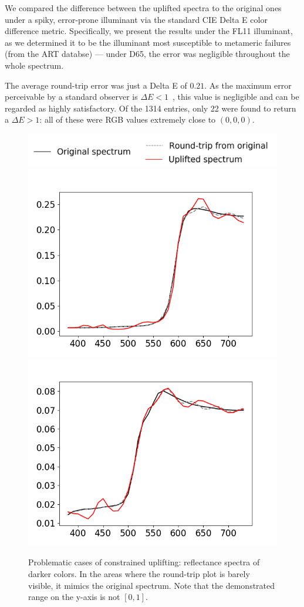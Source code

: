 We compared the difference between the uplifted spectra to the original ones under a spiky, error-prone illuminant via the standard CIE Delta E color difference metric. Specifically, we present the results under the FL11 illuminant, as we determined it to be the illuminant most susceptible to metameric failures (from the ART databse) --- under D65, the error was negligible throughout the whole spectrum.

The average round-trip error was just a Delta E of $0.21$. As the maximum error perceivable by a standard observer is $\Delta E<1$~\cite{maxColorDifference}, this value is negligible and can be regarded as highly satisfactory. Of the 1314 entries, only 22 were found to return a $\Delta E > 1$: all of these were RGB values extremely close to $(0,0,0)$. 

\begin{figure}[t!]
	\centering
	\includegraphics[width=0.6\linewidth]{img/seeding_accuracy_legend.png}
	\includegraphics[width=0.45\linewidth]{img/seeding_accuracy_dark_12coef.png}
	\includegraphics[width=0.45\linewidth]{img/seeding_accuracy_dark_14coef.png}
	\caption{Problematic cases of constrained uplifting: reflectance spectra of darker colors. In the areas where the round-trip plot is barely visible, it mimics the original spectrum. Note that the demonstrated range on the y-axis is not $[0,1]$.}
	\label{fig:seeding_accuracy_dark}
\end{figure}

